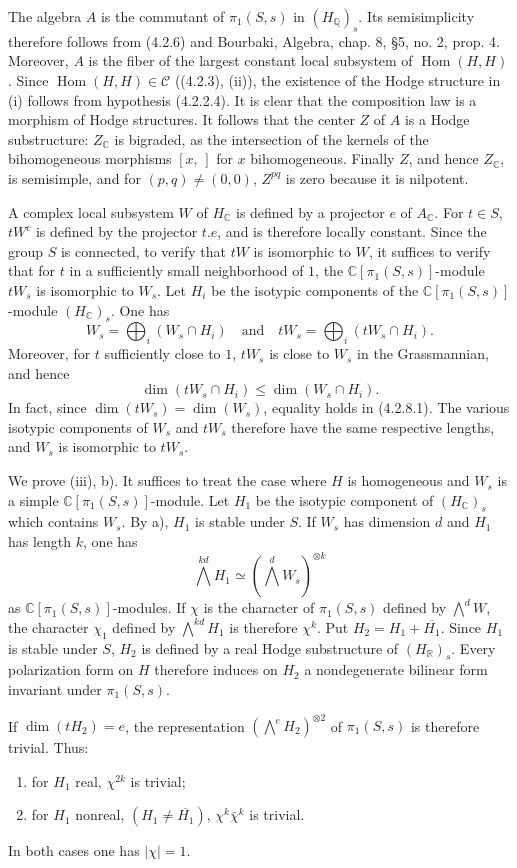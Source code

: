 \documentclass[10pt]{article}
\newcommand{\C}{\mathbb C}
\newcommand{\Q}{\mathbb Q}
\newcommand{\Hom}{\operatorname{Hom}}
\newcommand{\R}{\mathbb R}
\begin{document}
The algebra $A$ is the commutant of $\pi_1(S,s)$ in $(H_\Q)_s$. Its semisimplicity therefore follows from (4.2.6) and Bourbaki, Algebra, chap. 8, §5, no. 2, prop. 4. Moreover, $A$ is the fiber of the largest constant local subsystem of $\Hom(H,H)$. Since $\Hom(H,H)\in\mathcal C$ ((4.2.3), (ii)), the existence of the Hodge structure in (i) follows from hypothesis (4.2.2.4). It is clear that the composition law is a morphism of Hodge structures. It follows that the center $Z$ of $A$ is a Hodge substructure: $Z_\C$ is bigraded, as the intersection of the kernels of the bihomogeneous morphisms $[x,\,]$ for $x$ bihomogeneous. Finally $Z$, and hence $Z_\C$, is semisimple, and for $(p,q)\ne(0,0)$, $Z^{pq}$ is zero because it is nilpotent.

A complex local subsystem $W$ of $H_\C$ is defined by a projector $e$ of $A_\C$. For $t\in S$, $tW^c$ is defined by the projector $t.e$, and is therefore locally constant. Since the group $S$ is connected, to verify that $tW$ is isomorphic to $W$, it suffices to verify that for $t$ in a sufficiently small neighborhood of $1$, the $\C[\pi_1(S,s)]$-module $tW_s$ is isomorphic to $W_s$. Let $H_i$ be the isotypic components of the $\C[\pi_1(S,s)]$-module $(H_\C)_s$. One has
\[
W_s=\bigoplus_i(W_s\cap H_i)
\quad\text{and}\quad
tW_s=\bigoplus_i(tW_s\cap H_i).
\]
Moreover, for $t$ sufficiently close to $1$, $tW_s$ is close to $W_s$ in the Grassmannian, and hence
\[
\tag{4.2.8.1}
\dim(tW_s\cap H_i)\le \dim(W_s\cap H_i).
\]
In fact, since $\dim(tW_s)=\dim(W_s)$, equality holds in (4.2.8.1). The various isotypic components of $W_s$ and $tW_s$ therefore have the same respective lengths, and $W_s$ is isomorphic to $tW_s$.

We prove (iii), b). It suffices to treat the case where $H$ is homogeneous and $W_s$ is a simple $\C[\pi_1(S,s)]$-module. Let $H_1$ be the isotypic component of $(H_\C)_s$ which contains $W_s$. By a), $H_1$ is stable under $S$. If $W_s$ has dimension $d$ and $H_1$ has length $k$, one has
\[
\bigwedge^{kd}H_1\simeq(\bigwedge^dW_s)^{\otimes k}
\]
as $\C[\pi_1(S,s)]$-modules. If $\chi$ is the character of $\pi_1(S,s)$ defined by $\bigwedge^dW$, the character $\chi_1$ defined by $\bigwedge^{kd}H_1$ is therefore $\chi^k$. Put $H_2=H_1+\overline{H_1}$. Since $H_1$ is stable under $S$, $H_2$ is defined by a real Hodge substructure of $(H_\R)_s$. Every polarization form on $H$ therefore induces on $H_2$ a nondegenerate bilinear form invariant under $\pi_1(S,s)$.

If $\dim(tH_2)=e$, the representation $(\bigwedge^eH_2)^{\otimes2}$ of $\pi_1(S,s)$ is therefore trivial. Thus:
\begin{enumerate}[label=\alph*)]
\item for $H_1$ real, $\chi^{2k}$ is trivial;
\item for $H_1$ nonreal, $(H_1\ne\overline{H_1})$, $\chi^k\bar\chi^k$ is trivial.
\end{enumerate}
In both cases one has $|\chi|=1$.
\end{document}
